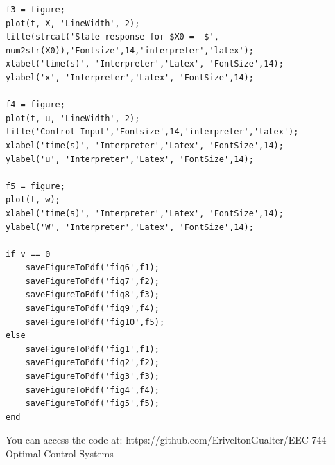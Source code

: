 \documentclass{article}
\begin{document}
\begin{lstlisting}
f3 = figure;
plot(t, X, 'LineWidth', 2);
title(strcat('State response for $X0 =  $', num2str(X0)),'Fontsize',14,'interpreter','latex');
xlabel('time(s)', 'Interpreter','Latex', 'FontSize',14);
ylabel('x', 'Interpreter','Latex', 'FontSize',14);

f4 = figure;
plot(t, u, 'LineWidth', 2);
title('Control Input','Fontsize',14,'interpreter','latex');
xlabel('time(s)', 'Interpreter','Latex', 'FontSize',14);
ylabel('u', 'Interpreter','Latex', 'FontSize',14);

f5 = figure;
plot(t, w);
xlabel('time(s)', 'Interpreter','Latex', 'FontSize',14);
ylabel('W', 'Interpreter','Latex', 'FontSize',14);

if v == 0
    saveFigureToPdf('fig6',f1);
    saveFigureToPdf('fig7',f2);
    saveFigureToPdf('fig8',f3);
    saveFigureToPdf('fig9',f4);
    saveFigureToPdf('fig10',f5);
else
    saveFigureToPdf('fig1',f1);
    saveFigureToPdf('fig2',f2);
    saveFigureToPdf('fig3',f3);
    saveFigureToPdf('fig4',f4);
    saveFigureToPdf('fig5',f5);
end
\end{lstlisting}

You can access the code at: https://github.com/EriveltonGualter/EEC-744-Optimal-Control-Systems
\end{document}
